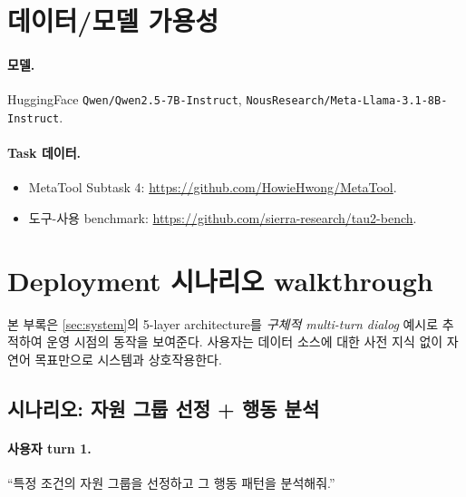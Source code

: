\documentclass[11pt]{article}
\theoremstyle{definition}
\begin{document}
\section{데이터/모델 가용성}
\label{app:data}

\paragraph{모델.} HuggingFace \texttt{Qwen/Qwen2.5-7B-Instruct}, \texttt{NousResearch/Meta-Llama-3.1-8B-Instruct}.

\paragraph{Task 데이터.}
\begin{itemize}[leftmargin=*]
\item MetaTool Subtask 4: \url{https://github.com/HowieHwong/MetaTool}.
\item 도구-사용 benchmark: \url{https://github.com/sierra-research/tau2-bench}.
\end{itemize}


\section{Deployment 시나리오 walkthrough}
\label{app:scenario}

본 부록은 \cref{sec:system}의 5-layer architecture를 \emph{구체적 multi-turn dialog} 예시로 추적하여 운영 시점의 동작을 보여준다. 사용자는 데이터 소스에 대한 사전 지식 없이 자연어 목표만으로 시스템과 상호작용한다.

\subsection{시나리오: 자원 그룹 선정 + 행동 분석}

\paragraph{사용자 turn 1.}
``특정 조건의 자원 그룹을 선정하고 그 행동 패턴을 분석해줘.''
\end{document}
